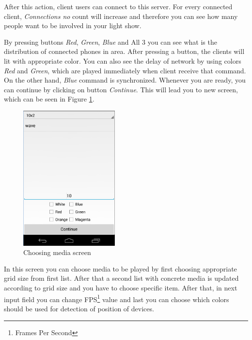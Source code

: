 After this action, client users can connect to this server.
For every connected client, \emph{Connections no} count will increase and therefore you can see how many people want to be involved in your light show.

By pressing buttons \emph{Red}, \emph{Green}, \emph{Blue} and All 3 you can see what is the distribution of connected phones in area. 
After pressing a button, the clients will lit with appropriate color.
You can also see the delay of network by using colors \emph{Red} and \emph{Green}, which are played immediately when client receive  that command.
On the other hand, \emph{Blue} command is synchronized.
Whenever you are ready, you can continue by clicking on button \emph{Continue}.
This will lead you to new screen, which can be seen in Figure \ref{fig:manual_server2}.

\begin{figure}[h]
	\centering
		\includegraphics[width=5cm]{appendix/server4.png}
	\caption{Choosing media screen}
	\label{fig:manual_server2}
\end{figure}

In this screen you can choose media to be played by first choosing appropriate grid size from first list.
After that a second list with concrete media is updated according to grid size and you have to choose specific item.
After that, in next input field you can change FPS\footnote{Frames Per Second} value and last you can choose which colors should be used for detection of position of devices.

